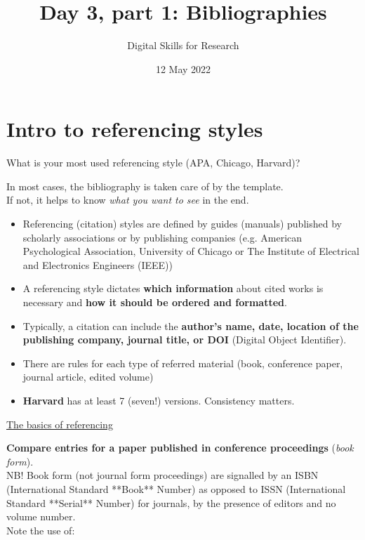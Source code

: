 \documentclass[a4paper,11pt]{article}
\title{Day 3, part 1: Bibliographies}
\author{Digital Skills for Research}
\date{12 May 2022}
\begin{document}
	
\clearpage
\maketitle
\thispagestyle{empty}

\tableofcontents

\section{Intro to referencing styles}

\begin{tcolorbox}[colback=red!5!white, colframe=red!75!black]
	\centering
	{\Large{What is your most used referencing style (APA, Chicago, Harvard)?}}
\end{tcolorbox}
\bigskip
In most cases, the bibliography is taken care of by the template. \\
If not, it helps to know \emph{what you want to see} in the end. 
\bigskip

\begin{itemize}
	\item Referencing (citation) styles are defined by guides (manuals) published by scholarly associations or by publishing companies (e.g. American Psychological Association, University of Chicago or The Institute of Electrical and Electronics Engineers (IEEE))
	\item A referencing style dictates \textbf{which information} about cited works is necessary and \textbf{how it should be ordered and formatted}.
	\item Typically, a citation can include the \textbf{author's name, date, location of the publishing company, journal title, or DOI} (Digital Object Identifier).
	\item There are rules for each type of referred material (book, conference paper, journal article, edited volume)
	\item \textbf{Harvard} has at least 7 (seven!) versions. Consistency matters. 
\end{itemize}

\href{https://www.citethemrightonline.com/Basics}{\underline{The basics of referencing}}

\medskip

\textbf{Compare entries for a paper published in conference proceedings} (\emph{book form}).\\
NB! Book form (not journal form proceedings) are signalled by an ISBN (International Standard **Book** Number) as opposed to  ISSN (International Standard **Serial** Number) for journals, by the presence of editors and no volume number.\\
\medskip
Note the use of:
\end{document}
